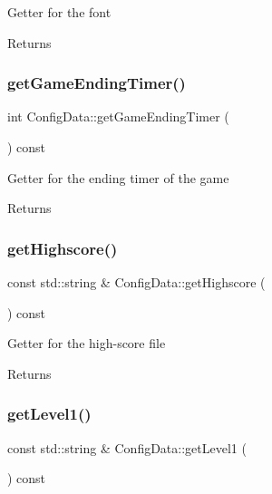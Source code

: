 Getter for the font \begin{DoxyReturn}{Returns}

\end{DoxyReturn}
\mbox{\label{classConfigData_a732dfa16f1cc3a38c734e7cef107300a}} 
\subsubsection{\texorpdfstring{get\+Game\+Ending\+Timer()}{getGameEndingTimer()}}
{\footnotesize\ttfamily int Config\+Data\+::get\+Game\+Ending\+Timer (\begin{DoxyParamCaption}{ }\end{DoxyParamCaption}) const}

Getter for the ending timer of the game \begin{DoxyReturn}{Returns}

\end{DoxyReturn}
\mbox{\label{classConfigData_a8b91e6a3dfe7cb880e9c5d43b6f0e00b}} 
\subsubsection{\texorpdfstring{get\+Highscore()}{getHighscore()}}
{\footnotesize\ttfamily const std\+::string \& Config\+Data\+::get\+Highscore (\begin{DoxyParamCaption}{ }\end{DoxyParamCaption}) const}

Getter for the high-\/score file \begin{DoxyReturn}{Returns}

\end{DoxyReturn}
\mbox{\label{classConfigData_a2e2c571c1dc23cc301a0dba85de97357}} 
\subsubsection{\texorpdfstring{get\+Level1()}{getLevel1()}}
{\footnotesize\ttfamily const std\+::string \& Config\+Data\+::get\+Level1 (\begin{DoxyParamCaption}{ }\end{DoxyParamCaption}) const}

